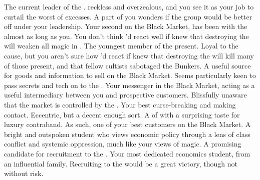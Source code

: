 \documentclass[char]{GL2020}
\begin{document}
\begin{contacts}
    \contact{\cChupLeader{}} The current leader of the \pGoaties{}. \cChupLeader{\They} \cChupLeader{\are} reckless and overzealous, and you see it as your job to curtail the worst of \cChupLeader{\their} excesses. A part of you wonders if the group would be better off under your leadership.
    \contact{\cChupInventor{}} Your second on the Black Market, \cChupInventor{} has been with the \pGoaties{} almost as long as you. You don't think \cChupInventor{\they}'d react well if  \cChupInventor{\they} knew that destroying the \pSc{} will weaken all magic in \pEarth{}.
    \contact{\cChupStudent{}} The youngest member of the \pGoaties{} present. Loyal to the cause, but you aren't sure how \cChupStudent{\they}'d react if \cChupStudent{\they} knew that destroying the \pSc{} will kill many of those present, and that \cChupStudent{\their} fellow cultists sabotaged the Bunkers.
    \contact{\cEthics{}} A useful source for goods and information to sell on the Black Market. Seems particularly keen to pass secrets and tech on to the \pShip{}.
    \contact{\cLibAssist{}} Your messenger in the Black Market, acting as a useful intermediary between you and prospective customers. Blissfully unaware that the market is controlled by the \pGoaties{}.
    \contact{\cCurse{}} Your best curse-breaking and making contact. Eccentric, but a decent enough sort.
    \contact{\cHedonist{}} A \cHedonist{\cleric} of \cFarmGod{} with a surprising taste for luxury contraband. As such, one of your best customers on the Black Market.
    \contact{\cPirateChild{\full}} A bright and outspoken \pShippie{} student who views economic policy through a lens of class conflict and systemic oppression, much like your views of magic. A promising candidate for recruitment to the \pGoaties{}.
     \contact{\cPresident{}} Your most dedicated economics student, from an influential \pShippie{} family. Recruiting \cPresident{\them} to the \pGoaties{} would be a great victory, though not without risk.
\end{contacts}
\end{document}
